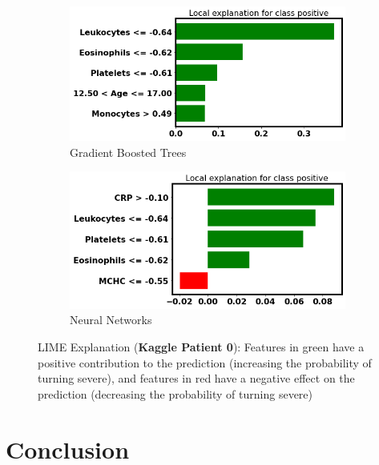 \begin{figure}[H] \ContinuedFloat
\begin{subfigure}[b]{\textwidth}
    \centering
    \includegraphics[width=\textwidth]{figures/chapter_interp/lime_kaggle_xgbc.png}
    \caption{Gradient Boosted Trees}
    \label{fig:lime_kaggle_xgbc}
\end{subfigure}
\hfill
\begin{subfigure}[b]{\textwidth}
    \centering
    \includegraphics[width=\textwidth]{figures/chapter_interp/lime_kaggle_nn.png}
    \caption{Neural Networks}
    \label{fig:lime_kaggle_nn}
\end{subfigure}
\hfill
\label{fig:kaggle_lime}
\caption{LIME Explanation (\textbf{Kaggle Patient 0}): Features in green have a positive contribution to the prediction (increasing the probability of turning severe), and features in red have a negative effect on the prediction (decreasing the probability of turning severe)}
\end{figure}
\vfill

\clearpage

\section{Conclusion}

